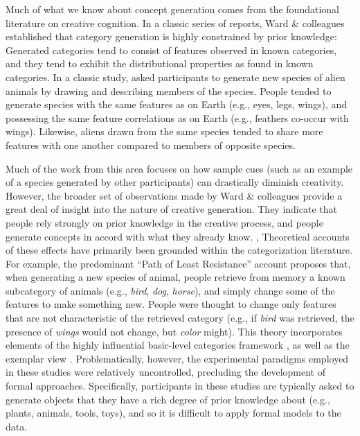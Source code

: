 \documentclass[12pt]{article}
\begin{document}
\begin{flushleft}
Much of what we know about concept generation comes from the foundational literature on creative cognition. In a classic series of reports, Ward \& colleagues \citep{ward1995s,ward1994structured,marsh1999inadvertent,ward2002role,smith1993constraining} established that category generation is highly constrained by prior knowledge: Generated categories tend to consist of features observed in known categories, and they tend to exhibit the distributional properties as found in known categories. In a classic study, \cite{ward1994structured} asked participants to generate new species of alien animals by drawing and describing members of the species. People tended to generate species with the same features as on Earth (e.g., eyes, legs, wings), and possessing the same feature correlations as on Earth (e.g., feathers co-occur with wings). Likewise, aliens drawn from the same species tended to share more features with one another compared to members of opposite species. 

Much of the work from this area \citep[e.g.,][]{smith1993constraining,marsh1999inadvertent} focuses on how sample cues (such as an example of a species generated by other participants) can drastically diminish creativity. However, the broader set of observations made by Ward \& colleagues provide a great deal of insight into the nature of creative generation. They indicate that people rely strongly on prior knowledge in the creative process, and people generate concepts in accord with what they already know. 
,
Theoretical accounts of these effects have primarily been grounded within the categorization literature. For example, the predominant ``Path of Least Resistance'' account \citep[see][]{ward1994structured,ward1995s,ward2002role} proposes that, when generating a new species of animal, people retrieve from memory a known subcategory of animals (e.g., \textit{bird}, \textit{dog}, \textit{horse}), and simply change some of the features to make something new. People were thought to change only features that are not characteristic of the retrieved category (e.g., if \textit{bird} was retrieved, the presence of \textit{wings} would not change, but \textit{color} might). This theory incorporates elements of the highly influential basic-level categories framework \citep{rosch1975cognitive,rosch1976basic}, as well as the exemplar view \citep{medin1978context,brooks1978nonanalytic}. Problematically, however, the experimental paradigms employed in these studies were relatively uncontrolled, precluding the development of formal approaches. Specifically, participants in these studies are typically asked to generate objects that they have a rich degree of prior knowledge about (e.g., plants, animals, tools, toys), and so it is difficult to apply formal models to the data.


\end{flushleft}
\end{document}
